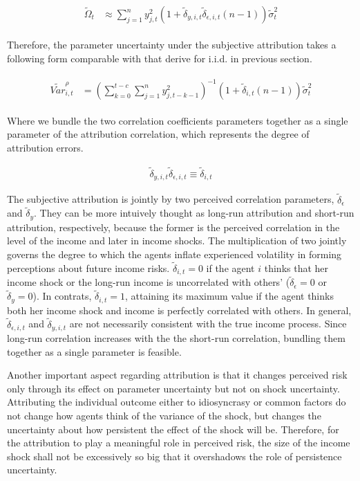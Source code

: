 \documentclass[12pt,notitlepage,onecolumn,aps,pra]{article}
\begin{document}
\begin{eqnarray}
\begin{split}
\tilde \Omega_{t} & \approx \sum^{n}_{j=1}y^2_{j,t} (1+\tilde \delta_{y,i,t}\tilde \delta_{\epsilon,i,t}(n-1))\tilde \sigma^2_{t}
\end{split}
\end{eqnarray}

Therefore, the parameter uncertainty under the subjective attribution
takes a following form comparable with that derive for i.i.d. in
previous section.

\begin{eqnarray}
\begin{split}
\tilde {Var}^{\rho}_{i,t} & = (\sum^{t-c}_{k=0}\sum^{n}_{j=1}y^2_{j,t-k-1})^{-1}(1+ \tilde\delta_{i,t}(n-1))\tilde{\sigma}^2_{t}
\end{split}
\end{eqnarray}

Where we bundle the two correlation coefficients parameters together as
a single parameter of the attribution correlation, which represents the
degree of attribution errors.

\begin{eqnarray}
\tilde \delta_{y,i,t}\tilde \delta_{\epsilon,i,t}\equiv \tilde \delta_{i,t}  
\end{eqnarray}

The subjective attribution is jointly by two perceived correlation
parameters, \(\tilde \delta_{\epsilon}\) and \(\tilde \delta_y\). They
can be more intuively thought as long-run attribution and short-run
attribution, respectively, because the former is the perceived
correlation in the level of the income and later in income shocks. The
multiplication of two jointly governs the degree to which the agents
inflate experienced volatility in forming perceptions about future
income risks. \(\tilde \delta_{i,t} = 0\) if the agent \(i\) thinks that
her income shock or the long-run income is uncorrelated with others'
(\(\tilde \delta_{\epsilon} = 0\) or \(\tilde \delta_y = 0\)). In
contrats, \(\tilde \delta_{i,t} = 1\), attaining its maximum value if
the agent thinks both her income shock and income is perfectly
correlated with others. In general, \(\tilde \delta_{\epsilon,i,t}\) and
\(\tilde \delta_{y,i,t}\) are not necessarily consistent with the true
income process. Since long-run correlation increases with the the
short-run correlation, bundling them together as a single parameter is
feasible.

Another important aspect regarding attribution is that it changes
perceived risk only through its effect on parameter uncertainty but not
on shock uncertainty. Attributing the individual outcome either to
idiosyncrasy or common factors do not change how agents think of the
variance of the shock, but changes the uncertainty about how persistent
the effect of the shock will be. Therefore, for the attribution to play
a meaningful role in perceived risk, the size of the income shock shall
not be excessively so big that it overshadows the role of persistence
uncertainty.
\end{document}
